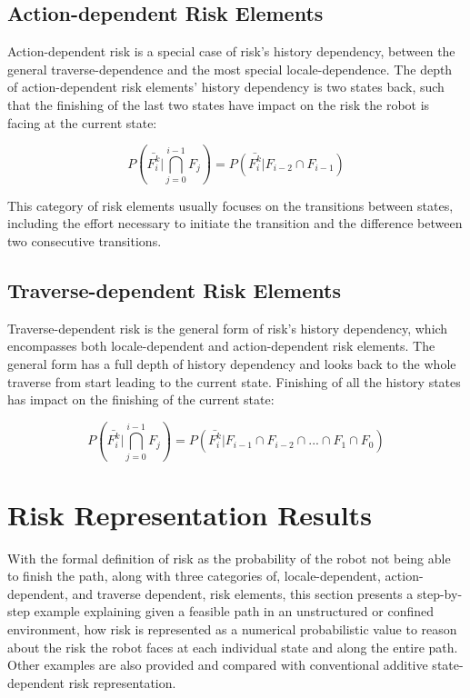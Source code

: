 \documentclass[letterpaper]{article} %
\begin{document}
\subsection{Action-dependent Risk Elements}
Action-dependent risk is a special case of risk's history dependency, between the general traverse-dependence and the most special locale-dependence. The depth of action-dependent risk elements' history dependency is two states back, such that the finishing of the last two states have impact on the risk the robot is facing at the current state: 

\begin{equation}
P(\bar{F_i^k} \vert \bigcap_{j=0}^{i-1} F_j) = P(\bar{F_i^k} \vert F_{i-2} \cap F_{i-1})
\end{equation}

This category of risk elements usually focuses on the transitions between states, including the effort necessary to initiate the transition and the difference between two consecutive transitions. 

\subsection{Traverse-dependent Risk Elements}
Traverse-dependent risk is the general form of risk's history dependency, which encompasses both locale-dependent and action-dependent risk elements. The general form has a full depth of history dependency and looks back to the whole traverse from start leading to the current state. Finishing of all the history states has impact on the finishing of the current state: 
 
\begin{equation}
P(\bar{F_i^k} \vert \bigcap_{j=0}^{i-1} F_j) = P(\bar{F_i^k} \vert F_{i-1} \cap F_{i-2} \cap ... \cap F_1 \cap F_0) 
\end{equation}

\section{Risk Representation Results}
With the formal definition of risk as the probability of the robot not being able to finish the path, along with three categories of, locale-dependent, action-dependent, and traverse dependent, risk elements, this section presents a step-by-step example explaining given a feasible path in an unstructured or confined environment, how risk is represented as a numerical probabilistic value to reason about the risk the robot faces at each individual state and along the entire path. Other examples are also provided and compared with conventional additive state-dependent risk representation. 
\end{document}
